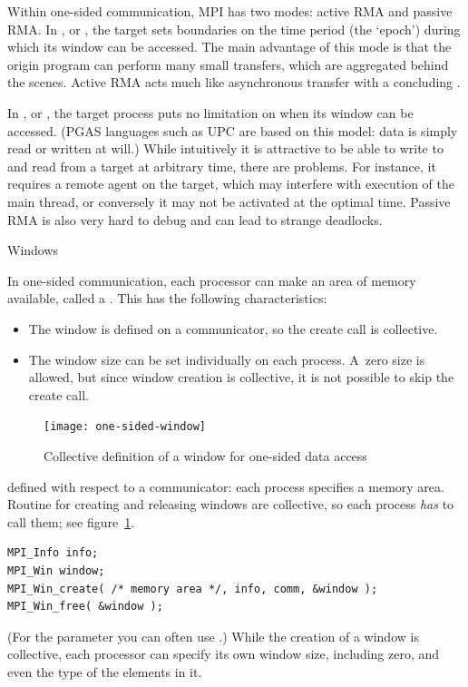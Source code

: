 Within one-sided communication, MPI has two modes: active RMA and
passive RMA. In , or ,
the target sets boundaries on the time period (the `epoch')
during which its window can be accessed.
The main advantage
of this mode is that the origin program can perform many small transfers, which are
aggregated behind the scenes. Active RMA acts much like asynchronous transfer with a
concluding .

In , or ,
the target process puts no limitation on when its window can be accessed.
(\ac{PGAS} languages such as \ac{UPC} are based on this model: data is 
simply read or written at will.)
While 
intuitively it is attractive to be able to write to and read from a target at
arbitrary time,
there are problems. For instance, it requires a remote agent on the target,
which may interfere with execution of the main thread, or conversely it may not be
activated at the optimal time. Passive RMA is also very hard to debug and can lead
to strange deadlocks.


 {Windows}
\label{sec:windows}

In one-sided communication, each processor can make an area of memory
available, called a . This has the following
characteristics:
\begin{itemize}
\item The window is defined on a communicator, so the create call
  is collective.
\item The window size can be set individually on each process.
  A~zero size is allowed, but since window creation is collective,
  it is not possible to skip the create call.
\end{itemize}
\begin{figure}[ht]
  \texttt{[image: one-sided-window]}
  \caption{Collective definition of a window for one-sided data access}
  \label{fig:window}
\end{figure}
defined with respect to a communicator: each process specifies a
memory area. Routine for creating and releasing windows
are collective, so each process \emph{has} to
call them; see figure~\ref{fig:window}. 
\begin{verbatim}
MPI_Info info;
MPI_Win window;
MPI_Win_create( /* memory area */, info, comm, &window );
MPI_Win_free( &window );
\end{verbatim}
(For the  parameter you can often use .)
While the creation of a window is collective, each
processor can specify its own window size, including zero, and even the type of the
elements in it.

